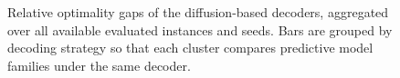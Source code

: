 \begin{figure}[t]
\begin{tikzpicture}
\end{tikzpicture}
\caption{Relative optimality gaps of the diffusion-based decoders, aggregated over all available evaluated instances and seeds. Bars are grouped by decoding strategy so that each cluster compares predictive model families under the same decoder.}
\label{fig:diffusion_gap_bars}
\end{figure}